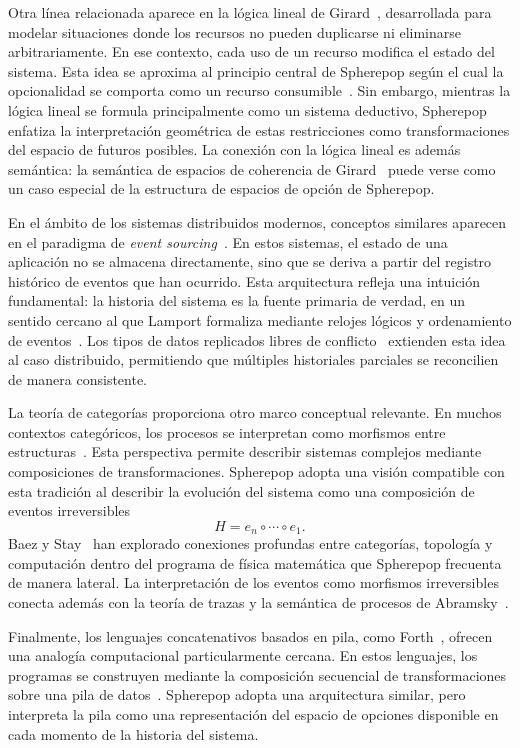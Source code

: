\documentclass[12pt]{article}
\theoremstyle{plain}
\theoremstyle{definition}
\begin{document}
Otra línea relacionada aparece en la lógica lineal de Girard~\cite{girard}, desarrollada para modelar situaciones donde los recursos no pueden duplicarse ni eliminarse arbitrariamente. En ese contexto, cada uso de un recurso modifica el estado del sistema. Esta idea se aproxima al principio central de Spherepop según el cual la opcionalidad se comporta como un recurso consumible~\cite{girard,abramsky}. Sin embargo, mientras la lógica lineal se formula principalmente como un sistema deductivo, Spherepop enfatiza la interpretación geométrica de estas restricciones como transformaciones del espacio de futuros posibles. La conexión con la lógica lineal es además semántica: la semántica de espacios de coherencia de Girard~\cite{girard} puede verse como un caso especial de la estructura de espacios de opción de Spherepop.

En el ámbito de los sistemas distribuidos modernos, conceptos similares aparecen en el paradigma de \emph{event sourcing}~\cite{fowler,kleppmann}. En estos sistemas, el estado de una aplicación no se almacena directamente, sino que se deriva a partir del registro histórico de eventos que han ocurrido. Esta arquitectura refleja una intuición fundamental: la historia del sistema es la fuente primaria de verdad, en un sentido cercano al que Lamport formaliza mediante relojes lógicos y ordenamiento de eventos~\cite{lamport}. Los tipos de datos replicados libres de conflicto~\cite{shapiro} extienden esta idea al caso distribuido, permitiendo que múltiples historiales parciales se reconcilien de manera consistente.

La teoría de categorías proporciona otro marco conceptual relevante. En muchos contextos categóricos, los procesos se interpretan como morfismos entre estructuras~\cite{maclane,awodey,jacobs}. Esta perspectiva permite describir sistemas complejos mediante composiciones de transformaciones. Spherepop adopta una visión compatible con esta tradición al describir la evolución del sistema como una composición de eventos irreversibles
\[
H = e_n \circ \cdots \circ e_1.
\]
Baez y Stay~\cite{baez} han explorado conexiones profundas entre categorías, topología y computación dentro del programa de física matemática que Spherepop frecuenta de manera lateral. La interpretación de los eventos como morfismos irreversibles conecta además con la teoría de trazas y la semántica de procesos de Abramsky~\cite{abramsky}.

Finalmente, los lenguajes concatenativos basados en pila, como Forth~\cite{moore}, ofrecen una analogía computacional particularmente cercana. En estos lenguajes, los programas se construyen mediante la composición secuencial de transformaciones sobre una pila de datos~\cite{okasaki,turner}. Spherepop adopta una arquitectura similar, pero interpreta la pila como una representación del espacio de opciones disponible en cada momento de la historia del sistema.
\end{document}
